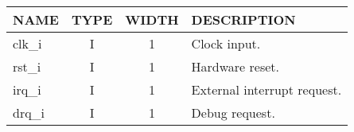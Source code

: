 {
\footnotesize
\begin{tabularx}{0.9\textwidth}{|l|c|c|X|}
  \hline
  \cellcolor{gray!20}\textbf{NAME} & \cellcolor{gray!20}\textbf{TYPE} & \cellcolor{gray!20}\textbf{WIDTH} & \cellcolor{gray!20}\textbf{DESCRIPTION} \\
  \hline
  clk\_i & I & 1 & Clock input. \\
  \hline
  rst\_i & I & 1 & Hardware reset. \\
  \hline
  irq\_i & I & 1 & External interrupt request. \\
  \hline
  drq\_i & I & 1 & Debug request. \\
  \hline
\end{tabularx}
}
